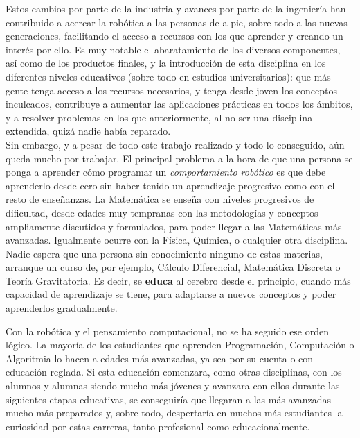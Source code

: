 Estos cambios por parte de la industria y avances por parte de la ingeniería han contribuido a acercar la robótica a las personas de a pie, sobre todo a las nuevas generaciones, facilitando el acceso a recursos con los que aprender y creando un interés por ello. Es muy notable el abaratamiento de los diversos componentes, así como de los productos finales, y la introducción de esta disciplina en los diferentes niveles educativos (sobre todo en estudios universitarios): que más gente tenga acceso a los recursos necesarios, y tenga desde joven los conceptos inculcados, contribuye a aumentar las aplicaciones prácticas en todos los ámbitos, y a resolver problemas en los que anteriormente, al no ser una disciplina extendida, quizá nadie había reparado. \\

Sin embargo, y a pesar de todo este trabajo realizado y todo lo conseguido, aún queda mucho por trabajar. El principal problema a la hora de que una persona se ponga a aprender cómo programar un \textit{comportamiento robótico} es que debe aprenderlo desde cero sin haber tenido un aprendizaje progresivo como con el resto de enseñanzas. La Matemática se enseña con niveles progresivos de dificultad, desde edades muy tempranas con las metodologías y conceptos ampliamente discutidos y formulados, para poder llegar a las Matemáticas más avanzadas. Igualmente ocurre con la Física, Química, o cualquier otra disciplina. Nadie espera que una persona sin conocimiento ninguno de estas materias, arranque  un curso de, por ejemplo, Cálculo Diferencial, Matemática Discreta o Teoría Gravitatoria. Es decir, se \textbf{educa} al cerebro desde el principio, cuando más capacidad de aprendizaje se tiene, para adaptarse a nuevos conceptos y poder aprenderlos gradualmente. \\
\par Con la robótica y el pensamiento computacional, no se ha seguido ese orden lógico. La mayoría de los estudiantes que aprenden Programación, Computación o Algoritmia lo hacen a edades más avanzadas, ya sea por su cuenta o con educación reglada. Si esta educación comenzara, como otras disciplinas, con los alumnos y alumnas siendo mucho más jóvenes y avanzara con ellos durante las siguientes etapas educativas, se conseguiría que llegaran a las más avanzadas mucho más preparados y, sobre todo, despertaría en muchos más estudiantes la curiosidad por estas carreras, tanto profesional como educacionalmente.\\

